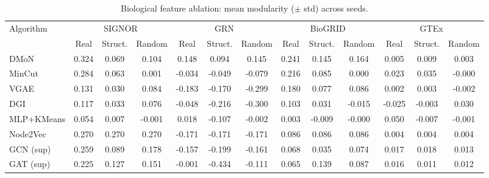 \begin{table}[htbp]
\centering
\caption{Biological feature ablation: mean modularity ($\pm$ std) across seeds.}
\label{tab:bio_ablation}
\small
\begin{tabular}{lcccccccccccc}
\toprule
Algorithm & \multicolumn{3}{c}{SIGNOR} & \multicolumn{3}{c}{GRN} & \multicolumn{3}{c}{BioGRID} & \multicolumn{3}{c}{GTEx} \\
 & Real & Struct. & Random & Real & Struct. & Random & Real & Struct. & Random & Real & Struct. & Random \\
\midrule
DMoN & 0.324 & 0.069 & 0.104 & 0.148 & 0.094 & 0.145 & 0.241 & 0.145 & 0.164 & 0.005 & 0.009 & 0.003 \\
MinCut & 0.284 & 0.063 & 0.001 & -0.034 & -0.049 & -0.079 & 0.216 & 0.085 & 0.000 & 0.023 & 0.035 & -0.000 \\
VGAE & 0.131 & 0.030 & 0.084 & -0.183 & -0.170 & -0.299 & 0.180 & 0.077 & 0.086 & 0.002 & 0.003 & -0.002 \\
DGI & 0.117 & 0.033 & 0.076 & -0.048 & -0.216 & -0.300 & 0.103 & 0.031 & -0.015 & -0.025 & -0.003 & 0.030 \\
MLP+KMeans & 0.054 & 0.007 & -0.001 & 0.018 & -0.107 & -0.002 & 0.003 & -0.009 & -0.000 & 0.050 & -0.007 & -0.001 \\
Node2Vec & 0.270 & 0.270 & 0.270 & -0.171 & -0.171 & -0.171 & 0.086 & 0.086 & 0.086 & 0.004 & 0.004 & 0.004 \\
GCN (sup) & 0.259 & 0.089 & 0.178 & -0.157 & -0.199 & -0.161 & 0.068 & 0.035 & 0.074 & 0.017 & 0.018 & 0.013 \\
GAT (sup) & 0.225 & 0.127 & 0.151 & -0.001 & -0.434 & -0.111 & 0.065 & 0.139 & 0.087 & 0.016 & 0.011 & 0.012 \\
\bottomrule
\end{tabular}
\end{table}